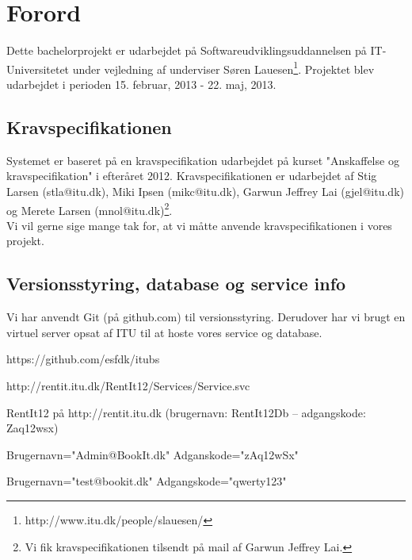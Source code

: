 \chapter{Forord}
\label{Preface}
Dette bachelorprojekt er udarbejdet på Softwareudviklingsuddannelsen på IT-Universitetet under vejledning af underviser Søren Lauesen\footnote{http://www.itu.dk/people/slauesen/}. Projektet blev udarbejdet i perioden 15. februar, 2013 - 22. maj, 2013.

\section*{Kravspecifikationen}
\label{Intro_kravspec}
Systemet er baseret på en kravspecifikation udarbejdet på kurset "Anskaffelse og kravspecifikation" i efteråret 2012. Kravspecifikationen er udarbejdet af Stig Larsen (stla@itu.dk), Miki Ipsen (mikc@itu.dk), Garwun Jeffrey Lai (gjel@itu.dk) og Merete Larsen (mnol@itu.dk)\footnote{Vi fik kravspecifikationen tilsendt på mail af Garwun Jeffrey Lai.}.
\\Vi vil gerne sige mange tak for, at vi måtte anvende kravspecifikationen i vores projekt.

\section*{Versionsstyring, database og service info}
\label{Intro_vs}
Vi har anvendt Git (på github.com) til versionsstyring. Derudover har vi brugt en virtuel server opsat af ITU til at hoste vores service og database.
\begin{my_description}
\item[GitHub repository] https://github.com/esfdk/itubs
\item[Service URL] http://rentit.itu.dk/RentIt12/Services/Service.svc
\item[Database] RentIt12 på http://rentit.itu.dk (brugernavn: RentIt12Db -- adgangskode: Zaq12wsx)
\item[Test Administrator] Brugernavn="Admin@BookIt.dk" Adganskode="zAq12wSx"
\item[Test Bruger] Brugernavn="test@bookit.dk" Adgangskode="qwerty123"
\end{my_description}